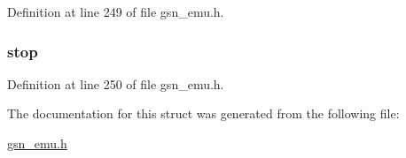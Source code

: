 Definition at line 249 of file gsn\_\-emu.h.

\hypertarget{a00061_a4ee10240be1d2d5d728c10050bb91287}{
\subsubsection[{stop}]{ {\bf stop}}}
\label{a00061_a4ee10240be1d2d5d728c10050bb91287}


Definition at line 250 of file gsn\_\-emu.h.



The documentation for this struct was generated from the following file:\begin{DoxyCompactItemize}
\item 
\hyperlink{a00489}{gsn\_\-emu.h}\end{DoxyCompactItemize}
